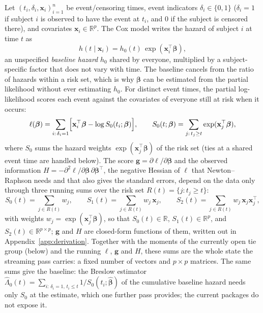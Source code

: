 \documentclass[11pt,a4paper]{article}
\begin{document}
Let $(t_i, \delta_i, \mathbf{x}_i)_{i=1}^n$ be event/censoring times, event
indicators $\delta_i \in \{0,1\}$ ($\delta_i = 1$ if subject $i$ is observed to
have the event at $t_i$, and $0$ if the subject is censored there), and
covariates $\mathbf{x}_i \in \mathbb{R}^p$. The Cox model writes the hazard of
subject $i$ at time $t$ as
\begin{equation}
    h(t \mid \mathbf{x}_i)
        = h_0(t)\,\exp(\mathbf{x}_i^\top\boldsymbol\beta),
    \label{eq:hazard}
\end{equation}
an unspecified \emph{baseline hazard} $h_0$ shared by everyone, multiplied by a
subject-specific factor that does not vary with time. The baseline cancels from
the ratio of hazards within a risk set, which is why $\boldsymbol\beta$ can be
estimated from the partial likelihood without ever estimating $h_0$. For
distinct event times, the partial log-likelihood scores each event against the
covariates of everyone still at risk when it occurs:
\begin{equation}
    \ell(\boldsymbol\beta) = \sum_{i:\,\delta_i=1}
        \Bigl[\mathbf{x}_i^\top\boldsymbol\beta
              - \log S_0(t_i;\boldsymbol\beta)\Bigr],
    \qquad
    S_0(t;\boldsymbol\beta) = \sum_{j:\,t_j \ge t}
        \exp(\mathbf{x}_j^\top\boldsymbol\beta),
    \label{eq:cox}
\end{equation}
where $S_0$ sums the hazard weights $\exp(\mathbf{x}_j^\top\boldsymbol\beta)$
of the risk set (ties at a shared event time are handled below). The score
$\mathbf{g} = \partial\ell/\partial\boldsymbol\beta$ and the observed information
$H = -\partial^2\ell/\partial\boldsymbol\beta\,\partial\boldsymbol\beta^\top$,
the negative Hessian of $\ell$ that Newton--Raphson needs and that also gives
the standard errors, depend on the data only through three running sums over the
risk set $R(t) = \{j : t_j \ge t\}$:
\begin{equation}
    S_0(t) = \sum_{j \in R(t)} w_j, \qquad
    S_1(t) = \sum_{j \in R(t)} w_j\,\mathbf{x}_j, \qquad
    S_2(t) = \sum_{j \in R(t)} w_j\,\mathbf{x}_j\mathbf{x}_j^\top,
    \label{eq:powersums}
\end{equation}
with weights $w_j = \exp(\mathbf{x}_j^\top\boldsymbol\beta)$, so that
$S_0(t) \in \mathbb{R}$, $S_1(t) \in \mathbb{R}^p$, and
$S_2(t) \in \mathbb{R}^{p \times p}$; $\mathbf{g}$ and $H$ are closed-form
functions of them, written out in Appendix~\ref{app:derivation}. Together with
the moments of the currently open tie group (below) and the running $\ell$,
$\mathbf{g}$ and $H$, these sums are the whole state the streaming pass
carries: a fixed number of vectors and $p \times p$ matrices. The same sums give the baseline:
the Breslow estimator
$\hat{\Lambda}_0(t) = \sum_{i:\,\delta_i=1,\,t_i \le t} 1/S_0(t_i;\hat{\boldsymbol\beta})$
of the cumulative baseline hazard \citep{breslow1974covariance} needs only $S_0$
at the estimate, which one further pass provides; the current packages do not
expose it.
\end{document}
